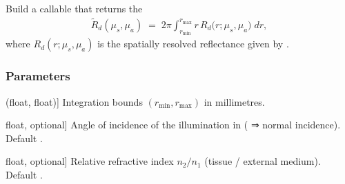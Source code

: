 \documentclass[letterpaper,10pt,english]{sphinxmanual}
\begin{document}

\begin{fulllineitems}
\label{\detokenize{generated/photon_canon.contrib.diffusion_theory:photon_canon.contrib.diffusion_theory.create_integrated_diffusion_approximation}}
\pysigstartsignatures
\pysiglinewithargsret
{}
{\sphinxparamcomma {}\sphinxparamcomma {}\sphinxparamcomma {}}
{}
\pysigstopsignatures
\sphinxAtStartPar
Build a callable that returns the 
\begin{equation*}
\begin{split}\tilde{R}_d(\mu_s, \mu_a)
\;=\;
2\pi \int_{r_{\min}}^{r_{\max}}
r \, R_d\!\bigl(r;\mu_s,\mu_a\bigr)\;dr,\end{split}
\end{equation*}
\sphinxAtStartPar
where \(R_d(r;\mu_s,\mu_a)\) is the spatially resolved
reflectance given by {\hyperref[\detokenize{generated/photon_canon.contrib.diffusion_theory:photon_canon.contrib.diffusion_theory.diffusion_approximation}]{}}.


\subsubsection{Parameters}
\label{\detokenize{generated/photon_canon.contrib.diffusion_theory:parameters}}\begin{description}
\sphinxlineitem{r\_range}{[}(float, float){]}
\sphinxAtStartPar
Integration bounds \((r_{\min}, r_{\max})\) in millimetres.

\sphinxlineitem{alpha\_i}{[}float, optional{]}
\sphinxAtStartPar
Angle of incidence of the illumination in 
( ⇒ normal incidence). Default .

\sphinxlineitem{n\_rel}{[}float, optional{]}
\sphinxAtStartPar
Relative refractive index \(n_2/n_1\)
(tissue / external medium). Default .


\end{description}
\end{fulllineitems}
\end{document}
